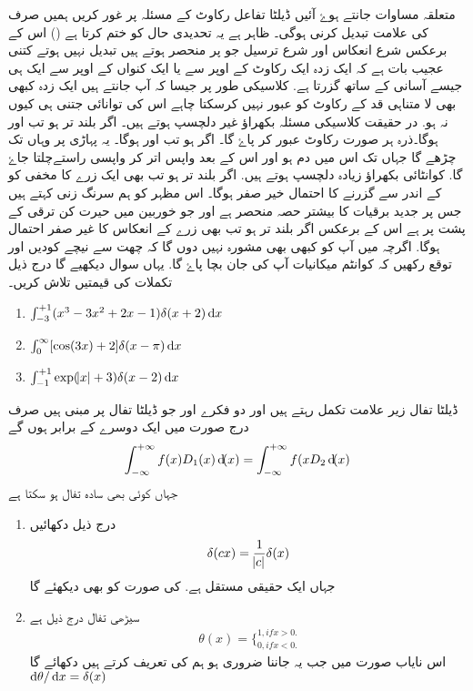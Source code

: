 متعلقہ مساوات جانتے ہوۓ آئیں ڈیلٹا تفاعل  رکاوٹ کے مسئلہ پر غور کریں 
ہمیں صرف   کی علامت تبدیل کرنی ہوگی۔ ظاہر ہے یہ تحدیدی حال کو ختم کرتا ہے ()
اس کے برعکس شرع انعکاس اور شرع ترسیل جو  پر منحصر ہوتے ہیں تبدیل نہیں ہوتے کتنی عجیب بات ہے کہ ایک زدہ ایک رکاوٹ کے اوپر سے یا ایک کنواں  کے اوپر سے ایک ہی جیسے آسانی کے ساتھ گزرتا ہے.  کلاسیکی طور پر جیسا کہ آپ جانتے ہیں ایک زدہ کبھی بھی لا متناہی  قد کے رکاوٹ کو عبور نہیں کرسکتا چاہے اس کی توانائی جتنی ہی کیوں نہ ہو.   در حقیقت کلاسیکی مسئلہ بکھراؤ غیر دلچسپ ہوتے ہیں۔ اگر  بلند تر ہو تب  اور  ہوگا۔ذرہ ہر صورت رکاوٹ عبور کر پاۓ گا۔ اگر    ہو تب  اور  ہوگا۔ یہ پہاڑی پر وہاں تک چڑھے گا جہاں تک اس میں دم ہو اور اس کے بعد واپس اتر کر واپسی راستےچلتا جاۓ گا. کوانٹائی بکھراؤ زیادہ دلچسپ ہوتے ہیں.  اگر   بلند تر ہو تب بھی ایک زرے کا مخفی کو کے اندر سے گزرنے کا احتمال خیر صفر ہوگا۔ اس مظہر کو ہم سرنگ زنی کہتے ہیں جس پر جدید برقیات کا بیشتر حصہ منحصر ہے اور جو خوربین میں حیرت کن ترقی کے پشت پر ہے اس کے برعکس  
اگر   بلند تر ہو تب بھی زرے کے انعکاس کا غیر صفر احتمال ہوگا. اگرچہ میں آپ کو کبھی بھی مشورہ نہیں دوں گا کہ چھت سے نیچے کودیں اور توقع رکھیں کہ کوانٹم میکانیات آپ کی جان بچا پاۓ گا. یہاں سوال  دیکھیے گا 
درج ذیل تکملات کی قیمتیں تلاش کریں۔  
\begin{enumerate}
\item\(\int_{-3}^{+1}(x^{3}-3x^{2}+2x-1) \delta(x+2) \dif{x}\)
\item\( \int_{0}^{\infty}[\cos(3x)+2] \delta(x-\pi) \dif{x}\)
\item\(\int_{-1}^{+1}\exp(\abs x+3) \delta (x-2) \dif{x}\)
\end{enumerate}
 ڈیلٹا تفال زیر علامت تکمل رہتے ہیں اور دو فکرے  اور جو ڈیلٹا تفال پر مبنی ہیں صرف درج صورت میں ایک دوسرے کے برابر ہوں گے  \begin{align}\int_{-\infty}^{+\infty}f(x) D_1(x) \dif(x)=\int_{-\infty}^{+\infty}f(x D_2 \dif(x)\end{align} جہاں   کوئی بھی سادہ تفال ہو سکتا ہے  
\begin{enumerate}
\item درج ذیل دکھائیں
 \begin{align}\delta(cx)=\frac{1}{\abs c}\delta(x)\end{align}
جہاں  ایک حقیقی مستقل ہے.   کی صورت کو بھی دیکھئے گا 
\item    سیڑھی تفال   درج ذیل ہے 
\begin{align}\theta(x)=\{^{1, if x>0.}_{0,if x<0.}\end{align}
 اس نایاب صورت میں جب یہ جاننا ضروری ہو ہم  کی تعریف  کرتے ہیں دکھائے گا  \(\dif{\theta}/\dif{x}=\delta(x)\)
\end{enumerate}
